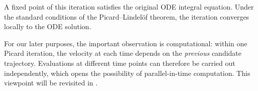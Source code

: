 A fixed point of this iteration satisfies the original ODE integral equation.
Under the standard conditions of the Picard--Lindel\"of theorem, the
iteration converges locally to the ODE solution.

For our later purposes, the important observation is computational:
within one Picard iteration, the velocity at each time depends on the
\emph{previous} candidate trajectory. Evaluations at different time points
can therefore be carried out independently, which opens the possibility of
parallel-in-time computation. This viewpoint will be revisited in
.










